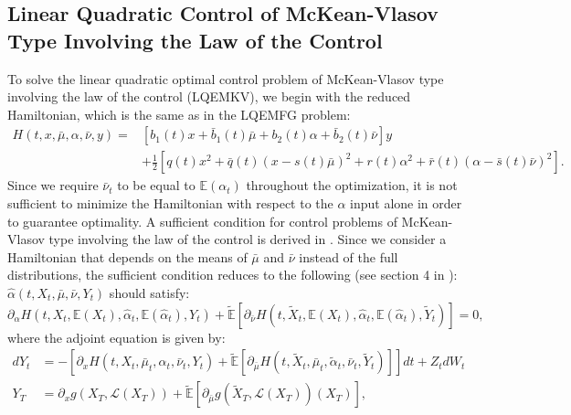\documentclass[11pt]{article}
\newcommand\cL{\mathcal L}
\begin{document}
\subsection{\textbf{Linear Quadratic Control of McKean-Vlasov Type Involving the Law of the Control}}\label{sec:EMKV}
To solve the linear quadratic optimal control problem of McKean-Vlasov type involving the law of the control (LQEMKV), we begin with the reduced Hamiltonian, which is the same as in the LQEMFG problem:
\begin{equation*}
\begin{split}
    H(t,x,\bar{\mu},\alpha,\bar{\nu},y)=&\left[b_1(t)x+\bar{b}_1(t)\bar{\mu}+b_2(t) \alpha+\bar{b}_2(t)\bar{\nu}\right]y\\
    &+\frac{1}{2}\left[q(t)x^2+\bar{q}(t)(x-s(t)\bar{\mu})^2 +r(t)\alpha^2+\bar{r}(t)(\alpha-\bar{s}(t)\bar{\nu})^2\right].
\end{split}
\end{equation*}
Since we require $\bar{\nu}_t$ to be equal to $\mathbb{E}(\alpha_t)$ throughout the optimization, it is not sufficient to minimize the Hamiltonian with respect to the $\alpha$ input alone in order to guarantee optimality. A sufficient condition for control problems of McKean-Vlasov type involving the law of the control is derived in \cite{carmona_acciaio}. Since we consider a Hamiltonian that depends on the means of $\bar{\mu}$ and $\bar{\nu}$ instead of the full distributions, the sufficient condition reduces to the following (see section 4 in \cite{carmona_acciaio}):
$\hat{\alpha}(t,X_t,\bar{\mu},\bar{\nu},Y_t)$ should satisfy:
\begin{equation*}
    \partial_{\alpha}H(t,X_t,\mathbb{E}(X_t),\hat{\alpha}_t,\mathbb{E}(\hat{\alpha}_t),Y_t)+\tilde{\mathbb{E}} \left[\partial_{\bar{\nu}}H(t,\tilde{X}_t,\mathbb{E}(X_t),\hat{\alpha}_t,\mathbb{E}(\hat{\alpha}_t),\tilde{Y}_t) \right]=0,
\end{equation*}
where the adjoint equation is given by:
\begin{equation*}
\begin{split}
    dY_t&=-\left[\partial_x H(t,X_t,\bar{\mu}_t,\alpha_t,\bar{\nu}_t,Y_t)+\tilde{\mathbb{E}} \left[\partial_{\bar{\mu}}H(t,\tilde{X}_t,\bar{\mu}_t,\tilde{\alpha}_t,\bar{\nu}_t,\tilde{Y}_t) \right] \right]dt+Z_tdW_t \\
    Y_T&=\partial_xg(X_T, \cL(X_T))+\tilde{\mathbb{E}} \left[\partial_{\bar{\mu}}g(\tilde{X}_T,\cL(X_T))(X_T) \right],
\end{split}
\end{equation*}
\end{document}
